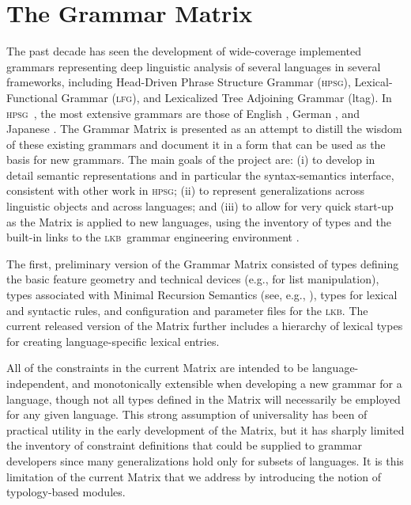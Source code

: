 \documentclass[11pt]{article}
\newcommand{\hpsg}{\textsc{hpsg}}
\newcommand{\lkb}{\textsc{lkb}}
\newcommand{\lfg}{\textsc{lfg}}
\begin{document}
\section{The Grammar Matrix}

The past decade has seen the development of wide-coverage implemented
grammars representing deep linguistic analysis of several languages in
several frameworks, including Head-Driven Phrase Structure Grammar
(\hpsg), Lexical-Functional Grammar (\lfg), and Lexicalized Tree
Adjoining Grammar ({\sc ltag}). In \hpsg\ \cite{Pol:Sag:94}, the most
extensive grammars are those of English \cite{Flickinger:00}, German
\cite{Mue:Kap:00}, and Japanese \cite{Siegel:00,Siegel:Bender:02}.
The Grammar Matrix \cite{Ben:Fli:Oe:02} is presented as 
an attempt to distill the
wisdom of these existing grammars and document it in a form that can
be used as the basis for new grammars. The main goals of the project
are: (i) to develop in detail semantic representations and in particular 
the syntax-semantics interface, consistent with other work in \hpsg; 
(ii) to represent generalizations across linguistic objects
and across languages; and (iii) to allow for very quick start-up as 
the Matrix is applied to new languages, using the inventory of types and
the built-in links to the \lkb\ grammar engineering environment
\cite{Copestake:02}.

The first, preliminary version of the Grammar Matrix 
consisted of types defining the basic feature geometry and technical
devices (e.g., for list manipulation), types associated with Minimal
Recursion Semantics (see, e.g., \cite{Cop:Las:Fli:01}), types for
lexical and syntactic rules, and configuration and parameter
files for the \lkb.  The current released version of the Matrix further 
includes a hierarchy of lexical types for creating language-specific 
lexical entries.

All of the constraints in the current Matrix are intended to be 
language-independent, and monotonically extensible when developing a
new grammar for a language, though not all types defined in the Matrix
will necessarily be employed for any given language.  This strong 
assumption of universality has been of practical utility in the early
development of the Matrix, but it has sharply limited the inventory of
constraint definitions that could be supplied to grammar developers
since many generalizations hold only for subsets of languages.  It is
this limitation of the current Matrix that we address by introducing
the notion of typology-based modules.
\end{document}
